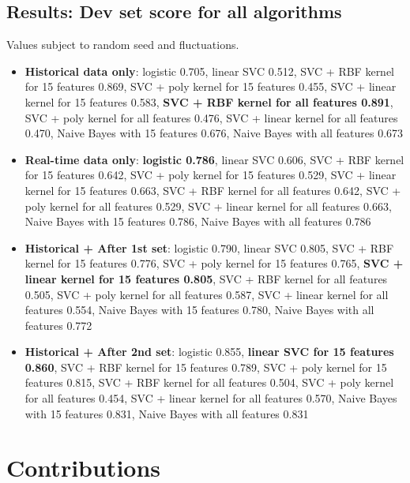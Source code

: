 \documentclass[paper=a4, fontsize=10pt]{scrartcl} %
\numberwithin{equation}{section} %
\numberwithin{figure}{section} %
\numberwithin{table}{section} %
\begin{document}
\subsection{Results: Dev set score for all algorithms}
\label{sec:app}
Values subject to random seed and fluctuations. 
\begin{itemize}
\item \textbf{Historical data only}: logistic 0.705, linear SVC 0.512, SVC + RBF kernel for 15 features 0.869, SVC + poly kernel for 15 features 0.455, SVC + linear kernel for 15 features 0.583, \textbf{SVC + RBF kernel for all features 0.891}, SVC + poly kernel for all features 0.476, SVC + linear kernel for all features 0.470, Naive Bayes with 15 features 0.676, Naive Bayes with all features 0.673
\item \textbf{Real-time data only}: \textbf{logistic 0.786}, linear SVC 0.606, SVC + RBF kernel for 15 features 0.642, SVC + poly kernel for 15 features 0.529, SVC + linear kernel for 15 features 0.663, SVC + RBF kernel for all features 0.642, SVC + poly kernel for all features 0.529, SVC + linear kernel for all features 0.663, Naive Bayes with 15 features 0.786, Naive Bayes with all features 0.786
\item \textbf{Historical + After 1st set}:  logistic 0.790,  linear SVC 0.805, SVC + RBF kernel for 15 features 0.776, SVC + poly kernel for 15 features 0.765, \textbf{SVC + linear kernel for 15 features 0.805}, SVC + RBF kernel for all features 0.505, SVC + poly kernel for all features 0.587, SVC + linear kernel for all features 0.554, Naive Bayes with 15 features 0.780, Naive Bayes with all features 0.772
\item \textbf{Historical + After 2nd set}: logistic 0.855, \textbf{linear SVC for 15 features 0.860},  SVC + RBF kernel for 15 features 0.789, SVC + poly kernel for 15 features 0.815, SVC + RBF kernel for all features 0.504, SVC + poly kernel for all features 0.454, SVC + linear kernel for all features 0.570, Naive Bayes with 15 features 0.831, Naive Bayes with all features 0.831
\end{itemize}
\section{Contributions}
\end{document}
